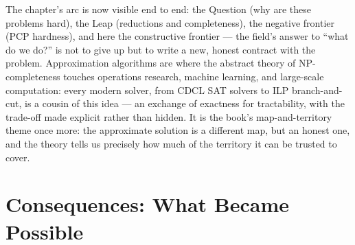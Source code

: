 The chapter's arc is now visible end to end: the Question (why are these problems hard), the Leap (reductions and completeness), the negative frontier (PCP hardness), and here the constructive frontier --- the field's answer to ``what do we do?'' is not to give up but to write a new, honest contract with the problem. Approximation algorithms are where the abstract theory of NP-completeness touches operations research, machine learning, and large-scale computation: every modern solver, from CDCL SAT solvers to ILP branch-and-cut, is a cousin of this idea --- an exchange of exactness for tractability, with the trade-off made explicit rather than hidden. It is the book's map-and-territory theme once more: the approximate solution is a different map, but an honest one, and the theory tells us precisely how much of the territory it can be trusted to cover.

\section{Consequences: What Became Possible}
\label{sec:np:consequences}

